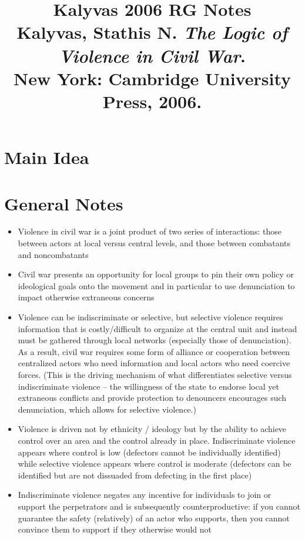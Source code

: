 \documentclass[12pt]{article}
\title{\textbf{Kalyvas 2006 RG Notes}\\
\large Kalyvas, Stathis N. \textit{The Logic of Violence in Civil War}.\\
New York: Cambridge University Press, 2006.}
\author{}
\date{}
\begin{document}
\maketitle

\section{Main Idea}



\section{General Notes}

\begin{itemize}[leftmargin=*, itemsep=4pt]
    \item Violence in civil war is a joint product of two series of interactions: those between actors at local versus central levels, and those between combatants and noncombatants
    \item Civil war presents an opportunity for local groups to pin their own policy or ideological goals onto the movement and in particular to use denunciation to impact otherwise extraneous concerns
    \item Violence can be indiscriminate or selective, but selective violence requires information that is costly/difficult to organize at the central unit and instead must be gathered through local networks (especially those of denunciation). As a result, civil war requires some form of alliance or cooperation between centralized actors who need information and local actors who need coercive forces. (This is the driving mechanism of what differentiates  selective versus indiscriminate violence -- the willingness of the state to endorse local yet extraneous conflicts and provide protection to denouncers encourages such denunciation, which allows for selective violence.)
    \item Violence is driven not by ethnicity / ideology but by the ability to achieve control over an area and the control already in place. Indiscriminate violence appears where control is low (defectors cannot be individually identified) while selective violence appears where control is moderate (defectors can be identified but are not dissuaded from defecting in the first place)
    \item Indiscriminate violence negates any incentive for individuals to join or support the perpetrators and is subsequently counterproductive: if you cannot guarantee the safety (relatively) of an actor who supports, then you cannot convince them to support if they otherwise would not

\end{itemize}
\end{document}
